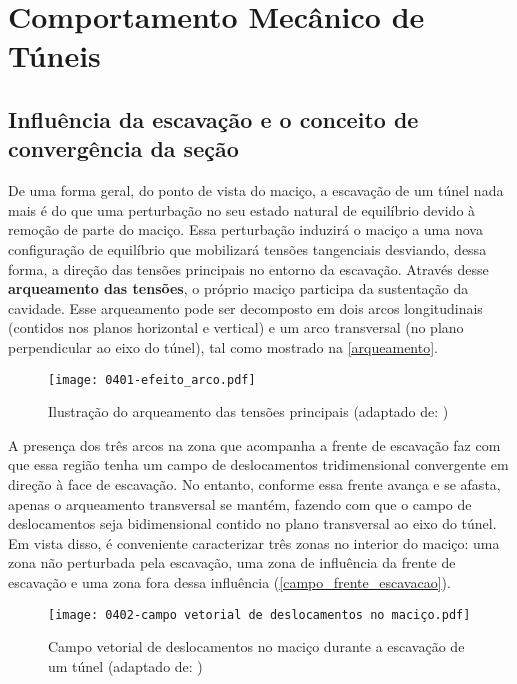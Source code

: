 \chapter{Comportamento Mecânico de Túneis}

\section{Influência da escavação e o conceito de convergência da seção}
\label{cap:Influência da escavação e o conceito de convergência da seção}
De uma forma geral, do ponto de vista do maciço, a escavação de um túnel nada mais é do que uma perturbação no seu estado natural de equilíbrio devido à remoção de parte do maciço. Essa perturbação induzirá o maciço a uma nova configuração de equilíbrio que mobilizará tensões tangenciais desviando, dessa forma, a direção das tensões principais no entorno da escavação. Através desse \textbf{arqueamento das tensões}, o próprio maciço participa da sustentação da cavidade. Esse arqueamento pode ser decomposto em dois arcos longitudinais (contidos nos planos horizontal e vertical) e um arco transversal (no plano perpendicular ao eixo do túnel), tal como mostrado na \autoref{arqueamento}.

\begin{figure}[H]
	\begin{center}
		\texttt{[image: 0401-efeito\_arco.pdf]}
	\end{center}
	\caption{\label{arqueamento}Ilustração do arqueamento das tensões principais (adaptado de: )}
\end{figure}

A presença dos três arcos na zona que acompanha a frente de escavação faz com que essa região tenha um campo de deslocamentos tridimensional convergente em direção à face de escavação. No entanto, conforme essa frente avança e se afasta, apenas o arqueamento transversal se mantém, fazendo com que o campo de deslocamentos seja bidimensional contido no plano transversal ao eixo do túnel. Em vista disso, é conveniente caracterizar três zonas no interior do maciço: uma zona não perturbada pela escavação, uma zona de influência da frente de escavação e uma zona fora dessa influência (\autoref{campo_frente_escavacao}).

\begin{figure}[H]
	\begin{center}
		\texttt{[image: 0402-campo vetorial de deslocamentos no maciço.pdf]}
	\end{center}
	\caption{\label{campo_frente_escavacao}Campo vetorial de deslocamentos no maciço durante a escavação de um túnel (adaptado de: )}
\end{figure}

